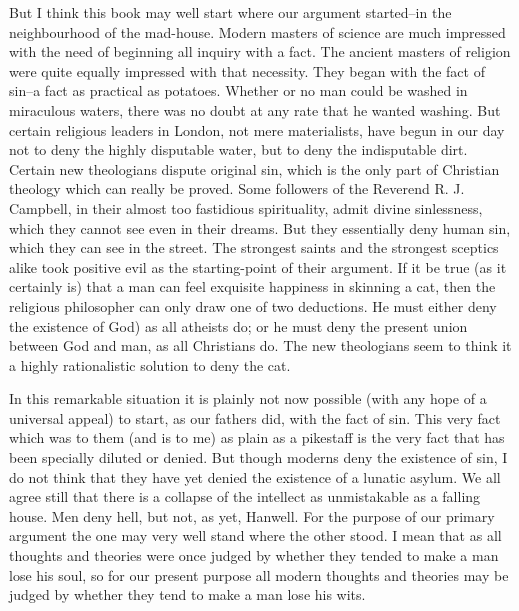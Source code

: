 \documentclass{book}
\begin{document}
But I think this book may well start where our argument started–in the neighbourhood of the mad-house. Modern masters of science are much impressed with the need of beginning all inquiry with a fact. The ancient masters of religion were quite equally impressed with that necessity. They began with the fact of sin–a fact as practical as potatoes. Whether or no man could be washed in miraculous waters, there was no doubt at any rate that he wanted washing. But certain religious leaders in London, not mere materialists, have begun in our day not to deny the highly disputable water, but to deny the indisputable dirt. Certain new theologians dispute original sin, which is the only part of Christian theology which can really be proved. Some followers of the Reverend R. J. Campbell, in their almost too fastidious spirituality, admit divine sinlessness, which they cannot see even in their dreams. But they essentially deny human sin, which they can see in the street. The strongest saints and the strongest sceptics alike took positive evil as the starting-point of their argument. If it be true (as it certainly is) that a man can feel exquisite happiness in skinning a cat, then the religious philosopher can only draw one of two deductions. He must either deny the existence of God) as all atheists do; or he must deny the present union between God and man, as all Christians do. The new theologians seem to think it a highly rationalistic solution to deny the cat.

In this remarkable situation it is plainly not now possible (with any hope of a universal appeal) to start, as our fathers did, with the fact of sin. This very fact which was to them (and is to me) as plain as a pikestaff is the very fact that has been specially diluted or denied. But though moderns deny the existence of sin, I do not think that they have yet denied the existence of a lunatic asylum. We all agree still that there is a collapse of the intellect as unmistakable as a falling house. Men deny hell, but not, as yet, Hanwell. For the purpose of our primary argument the one may very well stand where the other stood. I mean that as all thoughts and theories were once judged by whether they tended to make a man lose his soul, so for our present purpose all modern thoughts and theories may be judged by whether they tend to make a man lose his wits.
\end{document}
